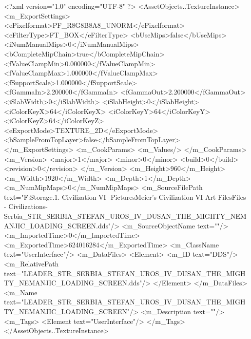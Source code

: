 <?xml version="1.0" encoding="UTF-8" ?>
<AssetObjects..TextureInstance>
	<m_ExportSettings>
		<ePixelformat>PF_R8G8B8A8_UNORM</ePixelformat>
		<eFilterType>FT_BOX</eFilterType>
		<bUseMips>false</bUseMips>
		<iNumManualMips>0</iNumManualMips>
		<bCompleteMipChain>true</bCompleteMipChain>
		<fValueClampMin>0.000000</fValueClampMin>
		<fValueClampMax>1.000000</fValueClampMax>
		<fSupportScale>1.000000</fSupportScale>
		<fGammaIn>2.200000</fGammaIn>
		<fGammaOut>2.200000</fGammaOut>
		<iSlabWidth>0</iSlabWidth>
		<iSlabHeight>0</iSlabHeight>
		<iColorKeyX>64</iColorKeyX>
		<iColorKeyY>64</iColorKeyY>
		<iColorKeyZ>64</iColorKeyZ>
		<eExportMode>TEXTURE_2D</eExportMode>
		<bSampleFromTopLayer>false</bSampleFromTopLayer>
	</m_ExportSettings>
	<m_CookParams>
		<m_Values/>
	</m_CookParams>
	<m_Version>
		<major>1</major>
		<minor>0</minor>
		<build>0</build>
		<revision>0</revision>
	</m_Version>
	<m_Height>960</m_Height>
	<m_Width>1920</m_Width>
	<m_Depth>1</m_Depth>
	<m_NumMipMaps>0</m_NumMipMaps>
	<m_SourceFilePath text="F:\Mod Storage\2.1. Civilization VI\Mods\Archive - Pictures\Sid Meier's Civilization VI Art Files\Art Files - Civilizations\Civilization - Serbia\LEADER_STR_SERBIA_STEFAN_UROS_IV_DUSAN_THE_MIGHTY_NEMANJIC_LOADING_SCREEN.dds"/>
	<m_SourceObjectName text=""/>
	<m_ImportedTime>0</m_ImportedTime>
	<m_ExportedTime>624016284</m_ExportedTime>
	<m_ClassName text="UserInterface"/>
	<m_DataFiles>
		<Element>
			<m_ID text="DDS"/>
			<m_RelativePath text="LEADER_STR_SERBIA_STEFAN_UROS_IV_DUSAN_THE_MIGHTY_NEMANJIC_LOADING_SCREEN.dds"/>
		</Element>
	</m_DataFiles>
	<m_Name text="LEADER_STR_SERBIA_STEFAN_UROS_IV_DUSAN_THE_MIGHTY_NEMANJIC_LOADING_SCREEN"/>
	<m_Description text=""/>
	<m_Tags>
		<Element text="UserInterface"/>
	</m_Tags>
</AssetObjects..TextureInstance>

